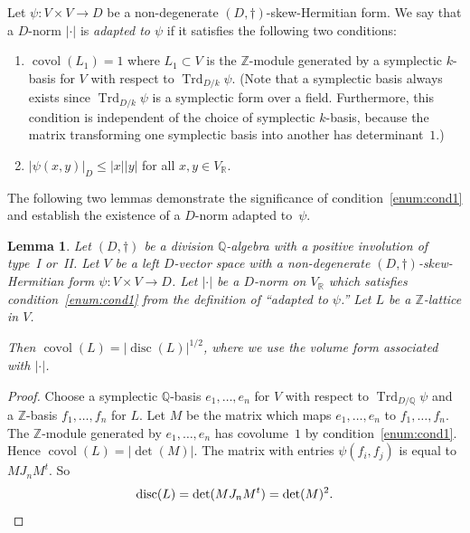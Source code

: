 \documentclass[11pt]{article}
\numberwithin{equation}{section}
\newcommand{\bQ}{\mathbb{Q}}
\newcommand{\bR}{\mathbb{R}}
\newcommand{\bZ}{\mathbb{Z}}
\DeclareMathOperator{\covol}{covol}
\DeclareMathOperator{\disc}{disc}
\DeclareMathOperator{\Trd}{Trd}
\newcommand{\abs}[1]{\lvert #1 \rvert}
\newcommand{\defterm}[1]{\emph{#1}}
\newtheorem{lemma}{Lemma}[section]
\begin{document}
Let $\psi \colon V \times V \to D$ be a non-degenerate $(D,\dag)$-skew-Hermitian form.
We say that a $D$-norm $\abs{\cdot}$ is \defterm{adapted to $\psi$} if it satisfies the following two conditions:
\begin{enumerate}
\item\label{enum:cond1} $\covol(L_1) = 1$ where $L_1 \subset V$ is the $\bZ$-module generated by a symplectic $k$-basis for $V$ with respect to $\Trd_{D/k} \psi$.
(Note that a symplectic basis always exists since $\Trd_{D/k} \psi$ is a symplectic form over a field. Furthermore, this condition is independent of the choice of symplectic $k$-basis, because the matrix transforming one symplectic basis into another has determinant~$1$.)
\item\label{enum:cond2} $\abs{\psi(x, y)}_D \leq \abs{x} \abs{y}$ for all $x, y \in V_\bR$.
\end{enumerate}

The following two lemmas demonstrate the significance of condition~\eqref{enum:cond1} and establish the existence of a $D$-norm adapted to~$\psi$.

\begin{lemma} \label{covol-disc-lattice}
Let $(D,\dag)$ be a division $\bQ$-algebra with a positive involution of type~I or~II.
Let $V$ be a left $D$-vector space with a non-degenerate $(D,\dag)$-skew-Hermitian form $\psi \colon V \times V \to D$.
Let $\abs{\cdot}$ be a $D$-norm on $V_\bR$ which satisfies condition~\eqref{enum:cond1} from the definition of ``adapted to $\psi$.''
Let $L$ be a $\bZ$-lattice in $V$.

Then $\covol(L) = \abs{\disc(L)}^{1/2}$, where we use the volume form associated with $\abs{\cdot}$.
\end{lemma}

\begin{proof}
Choose a symplectic $\bQ$-basis $e_1, \dotsc, e_n$ for $V$ with respect to $\Trd_{D/\bQ} \psi$ and a $\bZ$-basis $f_1, \dotsc, f_n$ for $L$.
Let $M$ be the matrix which maps $e_1, \dotsc, e_n$ to $f_1, \dotsc, f_n$.
The $\bZ$-module generated by $e_1, \dotsc, e_n$ has covolume~$1$ by condition~\eqref{enum:cond1}.
Hence $\covol(L) = \abs{\det(M)}$.
The matrix with entries $\psi(f_i, f_j)$ is equal to $MJ_nM^t$. So
\[
\disc(L) = \det(MJ_nM^t) = \det(M)^2.
\qedhere
\]
\end{proof}
\end{document}
